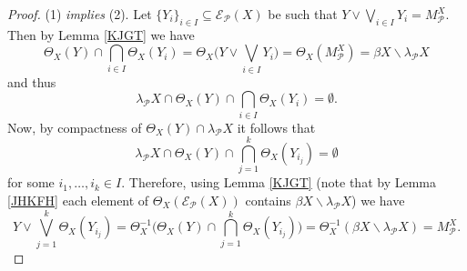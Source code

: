 \documentclass{amsart}
\theoremstyle{definition}
\theoremstyle{remark}
\theoremstyle{notation}
\numberwithin{equation}{section}
\begin{document}
\begin{proof}
(1) {\em  implies} (2). Let $\{Y_i\}_{i\in I}\subseteq{\mathscr E}_{{\mathcal P}}(X)$ be such
that $Y\vee\bigvee_{i\in I}Y_i=M^X_{{\mathcal P}}$. Then by Lemma \ref{KJGT} we have
\[\Theta_X(Y)\cap\bigcap_{i\in I}\Theta_X(Y_i)=\Theta_X\Big(Y\vee\bigvee_{i\in I}Y_i\Big)=\Theta_X(M^X_{{\mathcal P}})=\beta X\backslash\lambda_{{\mathcal P}} X\]
and thus
\[\lambda_{{\mathcal P}} X\cap\Theta_X(Y)\cap\bigcap_{i\in I}\Theta_X(Y_i)=\emptyset.\]
Now, by compactness of $\Theta_X(Y)\cap\lambda_{{\mathcal P}} X$ it follows that
\[\lambda_{{\mathcal P}} X\cap\Theta_X(Y)\cap\bigcap_{j=1}^k\Theta_X(Y_{i_j})=\emptyset\]
for some $i_1,\ldots,i_k\in I$. Therefore, using  Lemma \ref{KJGT} (note that by Lemma  \ref{JHKFH} each
element of $\Theta_X({\mathscr E}_{{\mathcal P}}(X))$ contains $\beta X\backslash\lambda_{{\mathcal P}} X$) we have
\[Y\vee\bigvee_{j=1}^k\Theta_X(Y_{i_j})=\Theta_X^{-1}\big(\Theta_X(Y)\cap\bigcap_{j=1}^k\Theta_X(Y_{i_j})\big)
=\Theta_X^{-1}(\beta X\backslash\lambda_{{\mathcal P}} X)=M^X_{{\mathcal P}}.\]


\end{proof}
\end{document}
